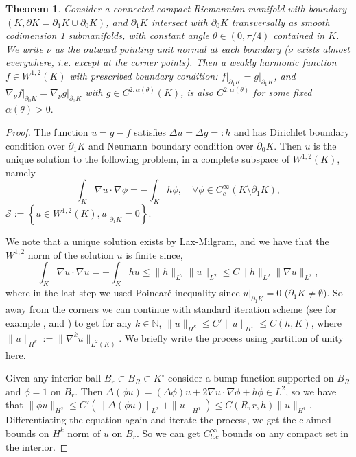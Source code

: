 \documentclass[12pt]{amsart}
\newcommand{\N}{\mathbb N}
\newcommand{\p}{\partial}
\newtheorem{theorem}{Theorem}[section]
\numberwithin{equation}{section}
\begin{document}
	\begin{theorem} \label{regularity}
		Consider a connected compact Riemannian manifold with boundary $(K,\partial K =\partial_1 K \cup\partial_0 K)$, and $\partial_1 K$ intersect with $\partial_0 K$ transversally as smooth codimension 1 submanifolds, with constant angle $\theta \in (0,\pi/4)$ contained in $K$. We write $\nu$ as the outward pointing unit normal at each boundary ($\nu$ exists almost everywhere, i.e. except at the corner points). Then a weakly harmonic function $f \in W^{1,2}(K)$ with prescribed boundary condition: $f\vert_{\partial_1 K}=g\vert_{\partial_1 K}$, and $\nabla_{\nu}f\vert_{\partial_0 K}=\nabla_{\nu}g\vert_{\partial_0 K}$ with $ g\in C^{2,\alpha(\theta)}(K)$, is also  $C^{2,\alpha(\theta)}$ for some fixed $\alpha(\theta)>0.$
	\end{theorem}
	\begin{proof}
		The function $u=g-f$ satisfies $\Delta u= \Delta g=:h$ and has Dirichlet boundary condition over $\partial_1 K$ and Neumann boundary condition over $\partial_0 K$. Then $u$ is the unique solution to the following problem, in a  complete subspace of $W^{1,2}(K)$, namely
		$$\int_K \nabla u \cdot \nabla \phi= - \int_K h\phi, \quad \forall \phi \in C^{\infty}_c(K\setminus \p_1 K),$$
		$\mathcal{S}:=\left\{ u \in W^{1,2}(K), u\vert_{\p_1 K}=0\right\}.$

		We note that a unique solution exists by Lax-Milgram, and we have that the $W^{1,2}$ norm of the solution $u$ is finite since,
		\begin{equation*}
			\int_K \nabla u \cdot \nabla u =-\int_K hu \leq \|h\|_{L^2} \|u\|_{L^2} \leq C \|h\|_{L^2} \|\nabla u\|_{L^2},
		\end{equation*}
		where in the last step we used Poincar\'e inequality since $u \vert_{\partial_1 K}=0$ ($\partial_1 K \neq \emptyset$).
		So away from the corners we can continue with standard iteration scheme (see for example \cite{Evans2010-PartialDifferentialEquations}, \cite{AmbroCarloMassa2018-LecturesEllipticPartial} and \cite{GilbaTrudi2001-EllipticPartialDifferential}) to get for any $k\in \N$, $\|u\|_{H^k} \leq C' \|u\|_{H^1} \leq C(h,K)$, where $\|u\|_{H^k}:=\|\nabla^k u\|_{L^2(K)}$. We briefly write the process using partition of unity here.

		Given any interior ball $B_r\subset B_R \subset K^{\circ}$ consider a bump function supported on $B_R$  and $\phi=1$ on $B_r$. Then $\Delta (\phi u)=(\Delta \phi) u + 2\nabla u \cdot \nabla \phi + h\phi \in L^2$, so we have that $\|\phi u\|_{H^2} \leq C' (\|\Delta (\phi u)\|_{L^2}+\|u\|_{H^1})\leq C(R,r,h) \|u\|_{H^1}$. Differentiating the equation again and iterate the process, we get the claimed bounds on $H^k$ norm of $u$ on $B_r$. So we can get $C^{\infty}_{loc}$ bounds on any compact set in the interior.
	


\end{proof}
\end{document}
